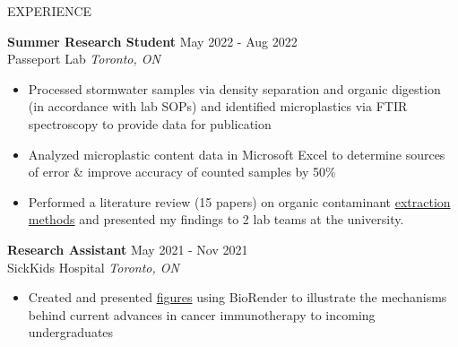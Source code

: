 \documentclass{resume}
\begin{document}
\begin{rSection}{EXPERIENCE}

\textbf{Summer Research Student} \hfill May 2022 - Aug 2022\\
Passeport Lab \hfill \textit{Toronto, ON}
\vspace{-0.2cm}
 \begin{itemize}
    \itemsep -8pt {} 
    \item Processed stormwater samples via density separation and organic digestion (in accordance with lab SOPs) and identified microplastics via FTIR spectroscopy to provide data for publication 
    \item Analyzed microplastic content data in Microsoft Excel to determine sources of error \& improve accuracy of counted samples by 50\%
    \item Performed a literature review (15 papers) on organic contaminant \href{https://drive.google.com/file/d/1tVPh5Zt4zLT8spiLfzJ4vu0XZSuMfOfu/view}{extraction methods} and presented my findings to 2 lab teams at the university. 

 \end{itemize}
 
\textbf{Research Assistant} \hfill May 2021 - Nov 2021\\
SickKids Hospital \hfill \textit{Toronto, ON}
\vspace{-0.2cm}
 \begin{itemize}
    \itemsep -8pt {} 
     \item Created and presented \href{https://drive.google.com/file/d/1459llsxjfB4-UA4sHfnBQ7wem0znVUL5/view?usp=sharing}{figures} using BioRender to illustrate the mechanisms behind current advances in cancer immunotherapy to incoming undergraduates
 \end{itemize}


\end{rSection}
\end{document}
